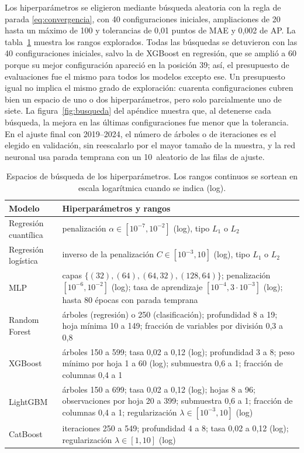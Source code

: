 Los hiperparámetros se eligieron mediante búsqueda aleatoria con la regla de parada \eqref{eq:convergencia}, con 40 configuraciones iniciales, ampliaciones de 20 hasta un máximo de 100 y tolerancias de 0,01 puntos de MAE y 0,002 de AP. La tabla~\ref{tab:espacios} muestra los rangos explorados. Todas las búsquedas se detuvieron con las 40 configuraciones iniciales, salvo la de XGBoost en regresión, que se amplió a 60 porque su mejor configuración apareció en la posición 39; así, el presupuesto de evaluaciones fue el mismo para todos los modelos excepto ese. Un presupuesto igual no implica el mismo grado de exploración: cuarenta configuraciones cubren bien un espacio de uno o dos hiperparámetros, pero solo parcialmente uno de siete. La figura~\ref{fig:busqueda} del apéndice muestra que, al detenerse cada búsqueda, la mejora en las últimas configuraciones fue menor que la tolerancia. En el ajuste final con 2019--2024, el número de árboles o de iteraciones es el elegido en validación, sin reescalarlo por el mayor tamaño de la muestra, y la red neuronal usa parada temprana con un 10\pct\ aleatorio de las filas de ajuste.

\begin{table}[htbp]\centering\small
\caption{Espacios de búsqueda de los hiperparámetros. Los rangos continuos se sortean en escala logarítmica cuando se indica (log).}\label{tab:espacios}
\begin{tabular}{l>{\raggedright\arraybackslash}p{10.1cm}}\toprule
Modelo & Hiperparámetros y rangos\\ \midrule
Regresión cuantílica & penalización $\alpha\in[10^{-7},10^{-2}]$ (log), tipo $L_1$ o $L_2$\\
Regresión logística & inverso de la penalización $C\in[10^{-3},10]$ (log), tipo $L_1$ o $L_2$\\
MLP & capas $\{(32),(64),(64,32),(128,64)\}$; penalización $[10^{-6},10^{-2}]$ (log); tasa de aprendizaje $[10^{-4},3\cdot10^{-3}]$ (log); hasta 80 épocas con parada temprana\\
Random Forest & 200 árboles (regresión) o 250 (clasificación); profundidad 8 a 19; hoja mínima 10 a 149; fracción de variables por división 0,3 a 0,8\\
XGBoost & árboles 150 a 599; tasa 0,02 a 0,12 (log); profundidad 3 a 8; peso mínimo por hoja 1 a 60 (log); submuestra 0,6 a 1; fracción de columnas 0,4 a 1\\
LightGBM & árboles 150 a 699; tasa 0,02 a 0,12 (log); hojas 8 a 96; observaciones por hoja 20 a 399; submuestra 0,6 a 1; fracción de columnas 0,4 a 1; regularización $\lambda\in[10^{-3},10]$ (log)\\
CatBoost & iteraciones 250 a 549; profundidad 4 a 8; tasa 0,02 a 0,12 (log); regularización $\lambda\in[1,10]$ (log)\\ \bottomrule
\end{tabular}
\end{table}

